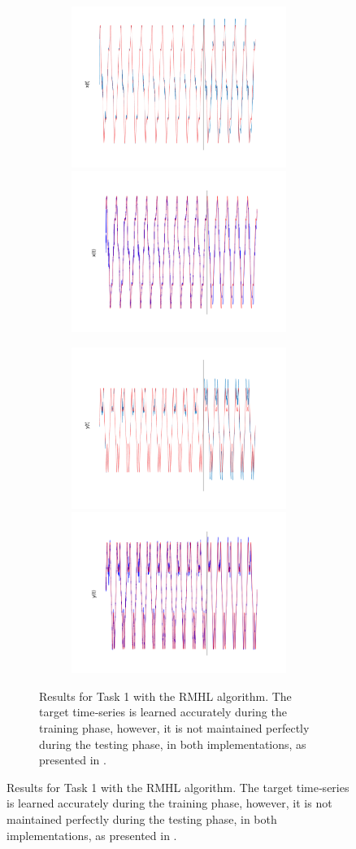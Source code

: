 \begin{figure}
\begin{subfigure}{\textwidth}
\begin{subfigure}{\textwidth}
        \end{subfigure}
         
        
        
        \textbf{}\begin{subfigure}{\textwidth}
        \centering
        
        \includegraphics[trim=2cm 0cm 0cm 0cm, clip=true,height=0.1\linewidth,width=.45\linewidth]{Figures/MATLAB/RMHL_T1_CoordinateX.png}
        \includegraphics[trim=2cm 0cm 0cm 0cm, clip=true,height=0.1\linewidth,width=.45\linewidth]{Figures/Python/RMHL_T1_CoordinateX.png}
        
        \end{subfigure}
         
        
        
        \textbf{}\begin{subfigure}{\textwidth}
        \centering
        
        \includegraphics[trim=2cm 0cm 0cm 0cm, clip=true,height=0.1\linewidth,width=.45\linewidth]{Figures/MATLAB/RMHL_T1_CoordinateY.png}
        \includegraphics[trim=2cm 0cm 0cm 0cm, clip=true,height=0.1\linewidth,width=.45\linewidth]{Figures/Python/RMHL_T1_CoordinateY.png}
        
        \end{subfigure}
        
    \caption{Results for Task 1 with the RMHL algorithm. The target time‐series is learned accurately during the training phase, however, it is not maintained perfectly during the testing phase, in both implementations, as presented in \cite{pyle2019}.}
    \label{Fig:compTask1RMHL}
    \end{subfigure}
    

\end{figure}
